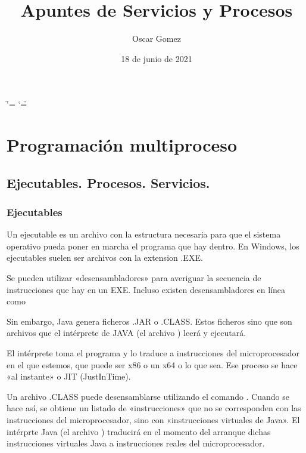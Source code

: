 \documentclass[letterpaper,10pt,spanish]{sphinxmanual}
\title{Apuntes de Servicios y Procesos}
\date{18 de junio de 2021}
\author{Oscar Gomez}
\begin{document}
\ifdefined\shorthandoff
  \ifnum\catcode`\=\string=\active\shorthandoff{=}\fi
  \ifnum\catcode`\"=\active{}\fi
\fi

\pagestyle{empty}
\sphinxmaketitle
\pagestyle{plain}
\sphinxtableofcontents
\pagestyle{normal}
\label{\detokenize{index::doc}}



\chapter{Programación multiproceso}
\label{\detokenize{textos/tema1:programacion-multiproceso}}\label{\detokenize{textos/tema1::doc}}

\section{Ejecutables. Procesos. Servicios.}
\label{\detokenize{textos/tema1:ejecutables-procesos-servicios}}

\subsection{Ejecutables}
\label{\detokenize{textos/tema1:ejecutables}}
Un ejecutable es un archivo con la estructura necesaria para que el sistema operativo pueda poner en marcha el programa que hay dentro. En Windows, los ejecutables suelen ser archivos con la extension .EXE.

Se pueden utilizar «desensambladores» para averiguar la secuencia de instrucciones que hay en un EXE. Incluso existen desensambladores en línea como 

Sin embargo, Java genera ficheros .JAR o .CLASS. Estos ficheros  sino que son archivos que el intérprete de JAVA (el archivo ) leerá y ejecutará.

El intérprete toma el programa y lo traduce a instrucciones del microprocesador en el que estemos, que puede ser x86 o un x64 o lo que sea. Ese proceso se hace «al instante» o JIT (Just\sphinxhyphen{}In\sphinxhyphen{}Time).

Un archivo .CLASS puede desensamblarse utilizando el comando  . Cuando se hace así, se obtiene un listado de «instrucciones» que no se corresponden con las instrucciones del microprocesador, sino con «instrucciones virtuales de Java». El intérprte Java (el archivo ) traducirá en el momento del arranque dichas instrucciones virtuales Java a instrucciones reales del microprocesador.
\end{document}
